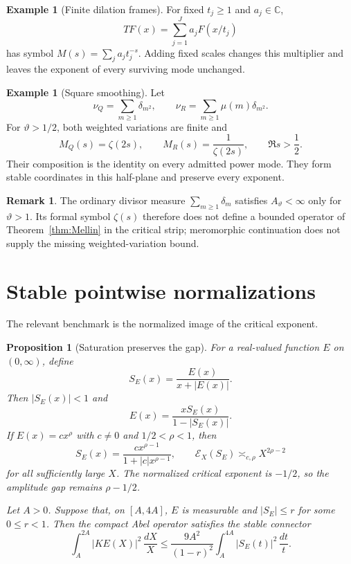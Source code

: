 \documentclass[11pt,a4paper]{amsart}
\newtheorem{proposition}[theorem]{Proposition}
\theoremstyle{definition}
\newtheorem{example}[theorem]{Example}
\newtheorem{remark}[theorem]{Remark}
\newcommand{\C}{\mathbb C}
\newcommand{\cE}{\mathcal E}
\begin{document}
\begin{example}[Finite dilation frames]\label{ex:finite-frame}
For fixed $t_j\ge1$ and $a_j\in\C$,
\[
 TF(x)=\sum_{j=1}^Ja_jF(x/t_j)
\]
has symbol $M(s)=\sum_ja_jt_j^{-s}$.  Adding fixed scales changes this multiplier and leaves the exponent of every surviving mode unchanged.
\end{example}

\begin{example}[Square smoothing]\label{ex:square}
Let
\[
 \nu_Q=\sum_{m\ge1}\delta_{m^2},
 \qquad
 \nu_R=\sum_{m\ge1}\mu(m)\delta_{m^2}.
\]
For $\vartheta>1/2$, both weighted variations are finite and
\[
 M_Q(s)=\zeta(2s),
 \qquad
 M_R(s)=\frac1{\zeta(2s)},
 \qquad \Re s>\frac12.
\]
Their composition is the identity on every admitted power mode.  They form stable coordinates in this half-plane and preserve every exponent.
\end{example}

\begin{remark}
The ordinary divisor measure $\sum_{m\ge1}\delta_m$ satisfies
$A_\vartheta<\infty$ only for $\vartheta>1$.  Its formal symbol $\zeta(s)$ therefore does not define a bounded operator of Theorem~\ref{thm:Mellin} in the critical strip; meromorphic continuation does not supply the missing weighted-variation bound.
\end{remark}

\section{Stable pointwise normalizations}\label{sec:normalization}

The relevant benchmark is the normalized image of the critical exponent.

\begin{proposition}[Saturation preserves the gap]\label{prop:saturation}
For a real-valued function $E$ on $(0,\infty)$, define
\begin{equation}\label{eq:saturation}
 S_E(x)=\frac{E(x)}{x+|E(x)|}.
\end{equation}
Then $|S_E(x)|<1$ and
\begin{equation}\label{eq:saturation-inverse}
 E(x)=\frac{xS_E(x)}{1-|S_E(x)|}.
\end{equation}
If $E(x)=cx^\rho$ with $c\ne0$ and $1/2<\rho<1$, then
\begin{equation}\label{eq:saturation-power}
 S_E(x)=\frac{cx^{\rho-1}}{1+|c|x^{\rho-1}},
 \qquad
 \cE_X(S_E)\asymp_{c,\rho}X^{2\rho-2}
\end{equation}
for all sufficiently large $X$.  The normalized critical exponent is $-1/2$, so the amplitude gap remains $\rho-1/2$.

Let $A>0$.  Suppose that, on $[A,4A]$, $E$ is measurable and
$|S_E|\le r$ for some $0\le r<1$.  Then the compact Abel operator satisfies the stable connector
\begin{equation}\label{eq:connector}
 \int_A^{2A}|KE(X)|^2\,\frac{dX}{X}
 \le \frac{9A^2}{(1-r)^2}
 \int_A^{4A}|S_E(t)|^2\,\frac{dt}{t}.
\end{equation}
\end{proposition}
\end{document}
